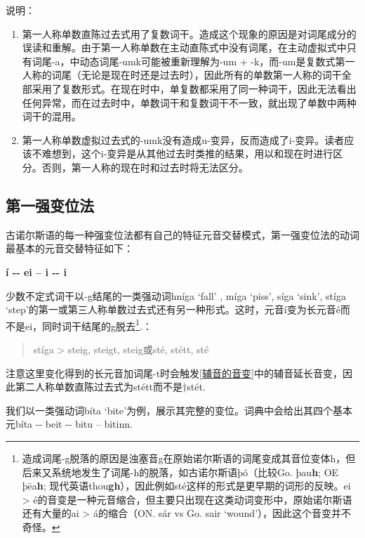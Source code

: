 说明：

\begin{enumerate}
  \def\labelenumi{\arabic{enumi})}
  \item
        \label{_Ref117719619}{}第一人称单数直陈过去式用了复数词干。造成这个现象的原因是对词尾成分的误读和重解。由于第一人称单数在主动直陈式中没有词尾，在主动虚拟式中只有词尾-a，中动态词尾-umk可能被重新理解为-um
        +
        -k，而-um是复数式第一人称的词尾（无论是现在时还是过去时），因此所有的单数第一人称的词干全部采用了复数形式。在现在时中，单复数都采用了同一种词干，因此无法看出任何异常，而在过去时中，单数词干和复数词干不一致，就出现了单数中两种词干的混用。
  \item
        第一人称单数虚拟过去式的-umk没有造成u-变异，反而造成了i-变异。读者应该不难想到，这个i-变异是从其他过去时类推的结果，用以和现在时进行区分。否则，第一人称的现在时和过去时将无法区分。
\end{enumerate}

\subsection{第一强变位法}\label{第一强变位法}

古诺尔斯语的每一种强变位法都有自己的特征元音交替模式，第一强变位法的动词最基本的元音交替特征如下：

\textbf{í -\/- ei -- i -\/- i}

少数不定式词干以-g结尾的一类强动词hníga `fall' , míga `piss', síga
`sink', stíga
`step'的第一或第三人称单数过去式还有另一种形式。这时，元音í变为长元音é而不是ei，同时词干结尾的g脱去\footnote{造成词尾-g脱落的原因是浊塞音g在原始诺尔斯语的词尾变成其音位变体h，但后来又系统地发生了词尾-h的脱落，如古诺尔斯语þó（比较Go.
  þau\textbf{h}; OE þēa\textbf{h};
  现代英语thou\textbf{gh}），因此例如sté这样的形式是更早期的词形的反映。ei
  \textgreater{}
  é的音变是一种元音缩合，但主要只出现在这类动词变形中，原始诺尔斯语还有大量的ai
  \textgreater{} á的缩合（ON. sár vs Go. sair
  `wound'），因此这个音变并不奇怪。}.：

\begin{quote}
  stíga \textgreater{} steig, steigt, steig或sté, stétt, sté
\end{quote}

注意这里变化得到的长元音加词尾-t时会触发\ref{辅音的音变}中的辅音延长音变，因此第二人称单数直陈过去式为stétt而不是†stét.

我们以一类强动词bíta
`bite'为例，展示其完整的变位。词典中会给出其四个基本元bíta -\/- beit
-\/- bitu -- bitinn.

